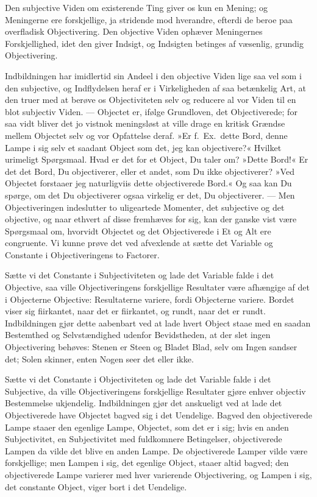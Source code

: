 \documentclass[12pt]{book}
\newcommand{\apage}[1]{\marginnote{\footnotesize\textit{[#1]}}}
\begin{document}
Den subjective Viden om existerende Ting giver os kun en Mening; og
Meningerne ere forskjellige, ja stridende mod hverandre, efterdi de
beroe paa overfladisk Objectivering. Den objective Viden ophæver
Meningernes Forskjellighed, idet den giver Indsigt, og Indsigten
betinges af væsenlig, grundig Objectivering.

Indbildningen har imidlertid sin Andeel i den objective Viden lige saa
vel som i den subjective, og Indflydelsen heraf er i Virkeligheden af
saa betænkelig Art, at den truer med at berøve os Objectiviteten selv
og reducere al vor Viden til en blot subjectiv Viden. --- Objectet er,
ifølge Grundloven, det Objectiverede; for saa vidt bliver det jo
vistnok meningsløst at ville drage en kritisk Grændse mellem Objectet
selv og vor Opfattelse deraf. »Er f.\ Ex.\ dette Bord, denne Lampe i sig
selv et saadant Object som det, jeg kan objectivere?« Hvilket urimeligt
Spørgsmaal. Hvad er det for et Object, Du taler om? »Dette Bord!« Er
det det Bord, Du objectiverer, eller et andet, som Du ikke objectiverer?
»Ved Objectet forstaaer jeg naturligviis dette objectiverede Bord.« Og
saa kan Du spørge, \apage{48} om det Du objectiverer ogsaa virkelig er det, Du
objectiverer. --- Men Objectiveringen indeslutter to uligeartede Momenter, det subjective
og det objective, og naar ethvert af disse fremhæves for sig, kan der
ganske vist være Spørgsmaal om, hvorvidt Objectet og det Objectiverede
i Et og Alt ere congruente. Vi kunne prøve det ved afvexlende at sætte
det Variable og Constante i Objectiveringens to Factorer.

Sætte vi det Constante i Subjectiviteten og lade det Variable falde i
det Objective, saa ville Objectiveringens forskjellige Resultater være
afhængige af det i Objecterne Objective: Resultaterne variere, fordi
Objecterne variere. Bordet viser sig fiirkantet, naar det er fiirkantet,
og rundt, naar det er rundt. Indbildningen gjør dette aabenbart ved at
lade hvert Object staae med en saadan Bestemthed og Selvstændighed
udenfor Bevidstheden, at der slet ingen Objectivering behøves: Stenen
er Steen og Bladet Blad, selv om Ingen sandser det; Solen skinner,
enten Nogen seer det eller ikke.

Sætte vi det Constante i Objectiviteten og lade det Variable falde i
det Subjective, da ville Objectiveringens forskjellige Resultater gjøre
enhver objectiv Bestemmelse ukjendelig. Indbildningen gjør det
anskueligt ved at lade det Objectiverede have Objectet bagved sig i
det Uendelige. Bagved den objectiverede Lampe staaer den egenlige
Lampe, Objectet, som det er i sig; hvis en anden Subjectivitet, en
Subjectivitet med fuldkomnere Betingelser, objectiverede Lampen da
vilde det blive en anden Lampe. De objectiverede Lamper vilde være
forskjellige; men Lampen i sig, \apage{49} det egenlige Object, staaer altid
bagved; den objectiverede Lampe varierer med hver varierende
Objectivering, og Lampen i sig, det constante Object, viger bort i det
Uendelige.
\end{document}
